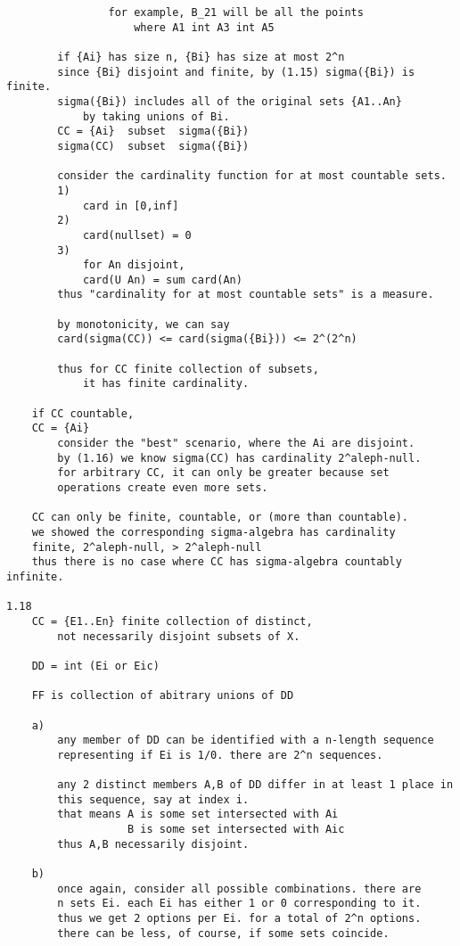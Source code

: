 \documentclass{article}
\begin{document}
\begin{flushleft}
\begin{verbatim}
                for example, B_21 will be all the points 
                    where A1 int A3 int A5

        if {Ai} has size n, {Bi} has size at most 2^n
        since {Bi} disjoint and finite, by (1.15) sigma({Bi}) is finite.
        sigma({Bi}) includes all of the original sets {A1..An} 
            by taking unions of Bi. 
        CC = {Ai}  subset  sigma({Bi})
        sigma(CC)  subset  sigma({Bi})

        consider the cardinality function for at most countable sets. 
        1)
            card in [0,inf]
        2)
            card(nullset) = 0 
        3)
            for An disjoint,
            card(U An) = sum card(An)
        thus "cardinality for at most countable sets" is a measure. 

        by monotonicity, we can say 
        card(sigma(CC)) <= card(sigma({Bi})) <= 2^(2^n)

        thus for CC finite collection of subsets, 
            it has finite cardinality. 
    
    if CC countable,
    CC = {Ai}
        consider the "best" scenario, where the Ai are disjoint. 
        by (1.16) we know sigma(CC) has cardinality 2^aleph-null. 
        for arbitrary CC, it can only be greater because set 
        operations create even more sets. 

    CC can only be finite, countable, or (more than countable).
    we showed the corresponding sigma-algebra has cardinality 
    finite, 2^aleph-null, > 2^aleph-null
    thus there is no case where CC has sigma-algebra countably infinite.
        
1.18
    CC = {E1..En} finite collection of distinct, 
        not necessarily disjoint subsets of X.

    DD = int (Ei or Eic)

    FF is collection of abitrary unions of DD 

    a)
        any member of DD can be identified with a n-length sequence 
        representing if Ei is 1/0. there are 2^n sequences. 

        any 2 distinct members A,B of DD differ in at least 1 place in 
        this sequence, say at index i. 
        that means A is some set intersected with Ai 
                   B is some set intersected with Aic 
        thus A,B necessarily disjoint. 
    
    b)
        once again, consider all possible combinations. there are 
        n sets Ei. each Ei has either 1 or 0 corresponding to it. 
        thus we get 2 options per Ei. for a total of 2^n options.
        there can be less, of course, if some sets coincide.


\end{verbatim}
\end{flushleft}
\end{document}
